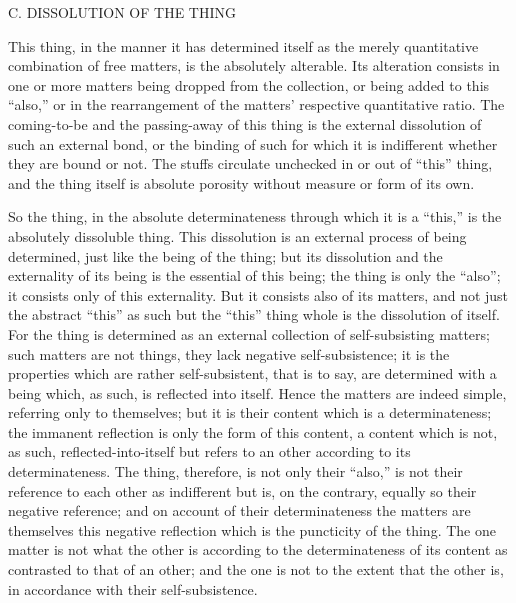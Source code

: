 C. DISSOLUTION OF THE THING

This thing, in the manner it has determined itself 
as the merely quantitative combination of free matters,
is the absolutely alterable.
Its alteration consists in one or more matters
being dropped from the collection,
or being added to this “also,”
or in the rearrangement of the matters' 
respective quantitative ratio.
The coming-to-be and the passing-away of this thing is
the external dissolution of such an external bond,
or the binding of such for which it is indifferent
whether they are bound or not.
The stuffs circulate unchecked in or out of “this” thing,
and the thing itself is absolute porosity
without measure or form of its own.

So the thing, in the absolute determinateness
through which it is a “this,”
is the absolutely dissoluble thing.
This dissolution is an external process of being determined,
just like the being of the thing;
but its dissolution and the externality of its being
is the essential of this being;
the thing is only the “also”;
it consists only of this externality.
But it consists also of its matters,
and not just the abstract “this” as such
but the “this” thing whole is the dissolution of itself.
For the thing is determined as an external collection
of self-subsisting matters;
such matters are not things, 
they lack negative self-subsistence;
it is the properties which are rather self-subsistent,
that is to say, are determined with a being
which, as such, is reflected into itself.
Hence the matters are indeed simple, referring only to themselves;
but it is their content which is a determinateness;
the immanent reflection is only the form of this content,
a content which is not, as such, reflected-into-itself
but refers to an other according to its determinateness.
The thing, therefore, is not only their “also,”
is not their reference to each other as indifferent
but is, on the contrary, equally so their negative reference;
and on account of their determinateness
the matters are themselves this negative reflection
which is the puncticity of the thing.
The one matter is not what the other is
according to the determinateness of its content
as contrasted to that of an other;
and the one is not to the extent that the other is,
in accordance with their self-subsistence.

